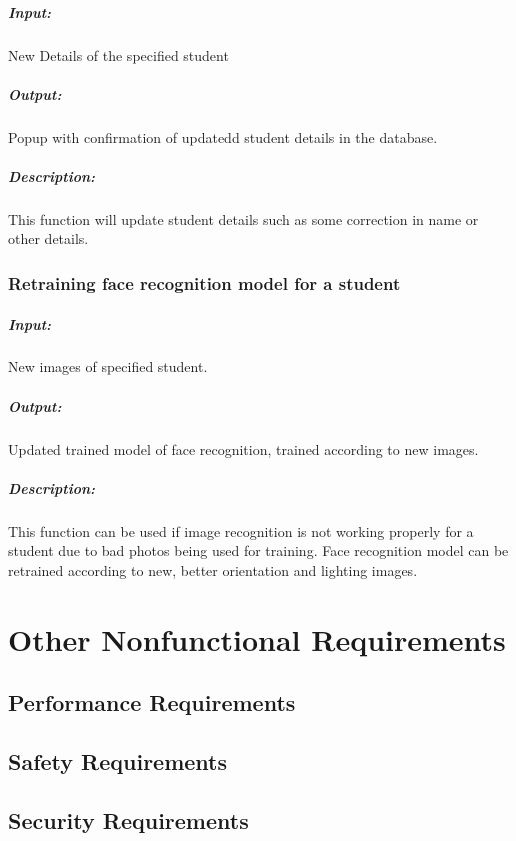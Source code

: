 \paragraph{Input:}
New Details of the specified student
\paragraph{Output:}
Popup with confirmation of updatedd student details in the database.
\paragraph{Description:} This function will update student details such as some correction in name or other details.

\subsection{Retraining face recognition model for a student}
\paragraph{Input:}
New images of specified student.
\paragraph{Output:}
Updated trained model of face recognition, trained according to new images.
\paragraph{Description:}
This function can be used if image recognition is not working properly for a student due to bad photos being used for training. Face recognition model can be retrained according to new, better orientation and lighting images.

\chapter{Other Nonfunctional Requirements}
\label{Other Nonfunctional Requirements}

\section{Performance Requirements}
\section{Safety Requirements}
\section{Security Requirements}
